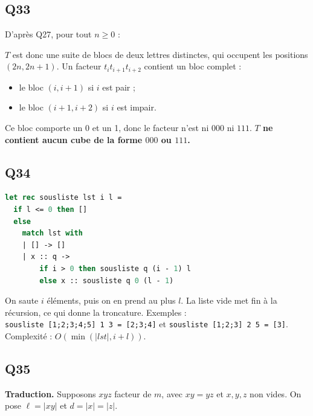 \documentclass[11pt,a4paper]{article}
\providecommand{\tightlist}{\setlength{\itemsep}{0pt}\setlength{\parskip}{0pt}}
\newcommand{\equationajustee}[1]{%
  \sbox{\boiteequation}{$\displaystyle #1$}%
  \ifdim\wd\boiteequation>\linewidth
    \[\resizebox{\linewidth}{!}{\usebox{\boiteequation}}\]%
  \else
    \[#1\]%
  \fi}
\begin{document}
\hypertarget{q33}{%
\subsection{Q33}\label{q33}}

D'après Q27, pour tout \(n\ge 0\) :

\equationajustee{t_{2n}t_{2n+1}=t_n\overline{t_n}\in\{01,10\}.}

\(T\) est donc une suite de blocs de deux lettres distinctes, qui occupent les positions \((2n,2n+1)\). Un facteur \(t_it_{i+1}t_{i+2}\) contient un bloc complet :

\begin{itemize}
\tightlist
\item
  le bloc \((i,i+1)\) si \(i\) est pair ;
\item
  le bloc \((i+1,i+2)\) si \(i\) est impair.
\end{itemize}

Ce bloc comporte un 0 et un 1, donc le facteur n'est ni \(000\) ni \(111\). \textbf{\(T\) ne contient aucun cube de la forme \(000\) ou \(111\).}

\hypertarget{q34}{%
\subsection{Q34}\label{q34}}

\begin{lstlisting}[language=Caml]
let rec sousliste lst i l =
  if l <= 0 then []
  else
    match lst with
    | [] -> []
    | x :: q ->
        if i > 0 then sousliste q (i - 1) l
        else x :: sousliste q 0 (l - 1)
\end{lstlisting}

On saute \(i\) éléments, puis on en prend au plus \(l\). La liste vide met fin à la récursion, ce qui donne la troncature. Exemples : \texttt{sousliste\ {[}1;\allowbreak{}2;\allowbreak{}3;\allowbreak{}4;\allowbreak{}5{]}\allowbreak{}\ 1\ 3\ =\allowbreak{}\ {[}2;\allowbreak{}3;\allowbreak{}4{]}\allowbreak{}} et \texttt{sousliste\ {[}1;\allowbreak{}2;\allowbreak{}3{]}\allowbreak{}\ 2\ 5\ =\allowbreak{}\ {[}3{]}\allowbreak{}}. Complexité : \(O(\min(|lst|,i+l))\).

\hypertarget{q35}{%
\subsection{Q35}\label{q35}}

\textbf{Traduction.} Supposons \(xyz\) facteur de \(m\), avec \(xy=yz\) et \(x,y,z\) non vides. On pose \(\ell=|xy|\) et \(d=|x|=|z|\).
\end{document}
